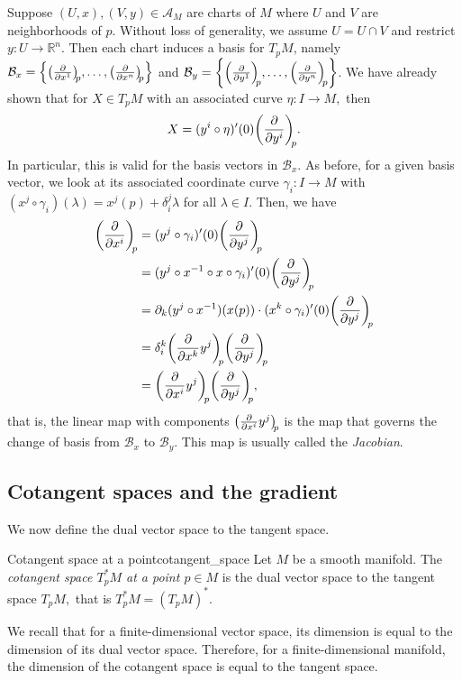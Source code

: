 Suppose \((U, x), (V, y) \in \mathscr{A}_M\) are charts of \(M\) where \(U\) and \(V\) are neighborhoods of \(p\). Without loss of generality, we assume \(U = U \cap V\) and restrict \(y : U \to \mathbb{R}^n\). Then each chart induces a basis for \(T_pM\), namely \(\mathcal{B}_x = \bset{x}{n}{p}\) and \(\mathcal{B}_y = \bset{y}{n}{p}\).  We have already shown that for \(X \in T_pM\) with an associated curve \(\eta : I \to M,\) then
\begin{equation*}
    X = (y^i \circ \eta)'(0) \bvec{y^i}{p}.
\end{equation*}
In particular, this is valid for the basis vectors in \(\mathcal{B}_x.\) As before, for a given basis vector, we look at its associated coordinate curve \(\gamma_i : I \to M\) with \((x^j \circ \gamma_i)(\lambda) = x^j(p) + \delta_i^j \lambda\) for all \(\lambda \in I\). Then, we have
\begin{align*}
    \bvec{x^i}{p} &= (y^j \circ \gamma_i)'(0) \bvec{y^j}{p}\\
                  &= (y^j \circ x^{-1} \circ x \circ \gamma_i)'(0) \bvec{y^j}{p}\\
                  &= \partial_k (y^j \circ x^{-1})(x(p)) \cdot (x^k \circ \gamma_i)'(0) \bvec{y^j}{p}\\
                  &= \delta_i^k \bvec[y^j]{x^k}{p} \bvec{y^j}{p}\\
                  &= \bvec[y^j]{x^i}{p} \bvec{y^j}{p},
\end{align*}
that is, the linear map with components \(\bvec[y^j]{x^i}{p}\) is the map that governs the change of basis from \(\mathcal{B}_x\) to \(\mathcal{B}_y\). This map is usually called the \emph{Jacobian}.

\subsection{Cotangent spaces and the gradient}

We now define the dual vector space to the tangent space.

\begin{definition}{Cotangent space at a point}{cotangent_space}
    Let \(M\) be a smooth manifold. The \emph{cotangent space \(T_p ^{\ast}M\) at a point \(p \in M\)} is the dual vector space to the tangent space \(T_pM,\) that is \(T_p ^{\ast}M = (T_pM)^{\ast}.\)
\end{definition}
\begin{remark}
    We recall that for a finite-dimensional vector space, its dimension is equal to the dimension of its dual vector space. Therefore, for a finite-dimensional manifold, the dimension of the cotangent space is equal to the tangent space.
\end{remark}


